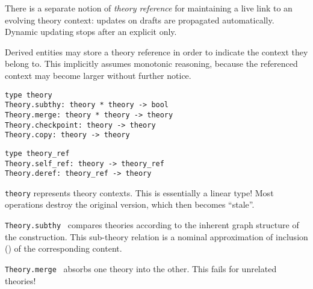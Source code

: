 \begin{isabellebody}
\begin{isamarkuptext}
  \medskip There is a separate notion of \emph{theory reference} for
  maintaining a live link to an evolving theory context: updates on
  drafts are propagated automatically.  Dynamic updating stops after
  an explicit  only.

  Derived entities may store a theory reference in order to indicate
  the context they belong to.  This implicitly assumes monotonic
  reasoning, because the referenced context may become larger without
  further notice.%
\end{isamarkuptext}%
\isamarkuptrue%
%
\isadelimmlref
%
\endisadelimmlref
%
\isatagmlref
%
\begin{isamarkuptext}%
\begin{mldecls}
  \verb|type theory| \\
  \verb|Theory.subthy: theory * theory -> bool| \\
  \verb|Theory.merge: theory * theory -> theory| \\
  \verb|Theory.checkpoint: theory -> theory| \\
  \verb|Theory.copy: theory -> theory| \\
  \end{mldecls}
  \begin{mldecls}
  \verb|type theory_ref| \\
  \verb|Theory.self_ref: theory -> theory_ref| \\
  \verb|Theory.deref: theory_ref -> theory| \\
  \end{mldecls}

  \begin{description}

  \item \verb|theory| represents theory contexts.  This is
  essentially a linear type!  Most operations destroy the original
  version, which then becomes ``stale''.

  \item \verb|Theory.subthy|~
  compares theories according to the inherent graph structure of the
  construction.  This sub-theory relation is a nominal approximation
  of inclusion (\isa{{\isasymsubseteq}}) of the corresponding content.

  \item \verb|Theory.merge|~
  absorbs one theory into the other.  This fails for unrelated
  theories!


\end{description}
\end{isamarkuptext}
\end{isabellebody}
